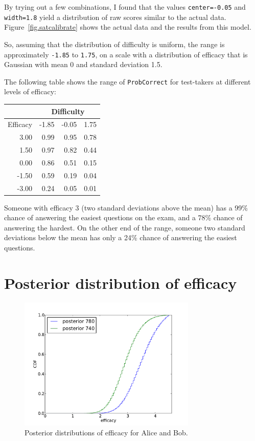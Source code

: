 \documentclass[12pt]{book}
\begin{document}
By trying out a few combinations, I found that
the values {\tt center=-0.05} and {\tt width=1.8} yield a distribution
of raw scores similar to the actual data.
Figure~\ref{fig.satcalibrate} shows the actual data and the results
from this model.

So, assuming that the distribution of difficulty is uniform,
the range is approximately
{\tt -1.85} to {\tt 1.75}, on a scale with a distribution of
efficacy that is Gaussian with mean 0 and standard deviation 1.5.

The following table shows the range of {\tt ProbCorrect} for
test-takers at different levels of efficacy:

\begin{tabular}{|r|r|r|r|}
\hline
           & \multicolumn{3}{|c|}{Difficulty} \\
\hline
Efficacy   & -1.85   &   -0.05   &      1.75  \\
\hline
3.00 &  0.99 &  0.95 &  0.78   \\
1.50 &  0.97 &  0.82 &  0.44   \\
0.00 &  0.86 &  0.51 &  0.15   \\
-1.50 &  0.59 &  0.19 &  0.04   \\
-3.00 &  0.24 &  0.05 &  0.01   \\
\hline
\end{tabular}

Someone with efficacy 3 (two standard deviations above
the mean) has a 99\% chance of answering the easiest questions on
the exam, and a 78\% chance of answering the hardest.  On the other
end of the range, someone two standard deviations below the mean
has only a 24\% chance of answering the easiest questions.


\section{Posterior distribution of efficacy}

\begin{figure}
\centerline{\includegraphics[height=2.5in]{figs/sat_posteriors_eff.pdf}}
\caption{Posterior distributions of efficacy for Alice and Bob.}
\label{fig.satposterior2}
\end{figure}
\end{document}
